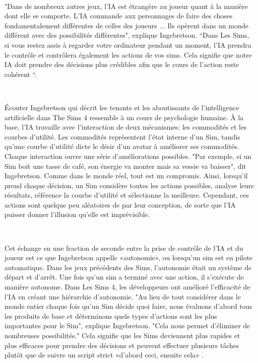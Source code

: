~\par
"Dans de nombreux autres jeux, l'IA est étrangère au joueur quant à la manière dont elle se comporte. L'IA commande aux personnages de faire des choses fondamentalement différentes de celles des joueurs ... Ils opèrent dans un monde différent avec des possibilités différentes", explique Ingebretson. “Dans Les Sims, si vous restez assis à regarder votre ordinateur pendant un moment, l'IA prendra le contrôle et contrôlera également les actions de vos sims. Cela signifie que notre IA  doit prendre des décisions plus crédibles afin que le cours de l’action reste cohérent “\parencite{simsArticle}.

~\par
Écouter Ingebretson qui décrit les tenants et les aboutissants de l’intelligence artificielle dans The Sims 4 ressemble à un cours de psychologie humaine. À la base, l'IA travaille avec l'interaction de deux mécanismes: les commodités et les courbes d'utilité. Les commodités représentent l'état interne d'un Sim, tandis qu'une courbe d'utilité dicte le désir d’un avatar à améliorer ses commodités. Chaque interaction ouvre une série d'améliorations possibles. "Par exemple, si un Sim boit une tasse de café, son énergie va monter mais sa vessie va baisser", dit Ingebretson. Comme dans le monde réel, tout est un compromis. Ainsi, lorsqu'il prend chaque décision, un Sim considère toutes les actions possibles, analyse leurs résultats, référence la courbe d'utilité et sélectionne la meilleure. Cependant, ces actions sont quelque peu aléatoires de par leur conception, de sorte que l'IA puisser donner l’illusion qu’elle est imprévisible.

~\par
Cet échange en une fraction de seconde entre la prise de contrôle de l’IA et du joueur est ce que Ingebretson appelle «autonomie», ou lorsqu'un sim est en pilote automatique. Dans les jeux précédents des Sims, l’autonomie était un système de départ et d’arrêt. Une fois qu'un sim a terminé avec une action, il s'exécute de manière autonome. Dans Les Sims 4, les développeurs ont amélioré l'efficacité de l'IA en créant une hiérarchie d'autonomie. "Au lieu de tout considérer dans le monde entier chaque fois qu'un Sim décide quoi faire, nous évaluons d'abord tous les produits de base et déterminons quels types d’actions sont les plus importantes pour le Sim", explique Ingebretson. "Cela nous permet d'éliminer de nombreuses possibilités." Cela signifie que les Sims deviennent plus rapides et plus efficaces pour prendre des décisions et peuvent effectuer plusieurs tâches plutôt que de suivre un script strict «d'abord ceci, ensuite cela» \parencite{simsArticle}.

